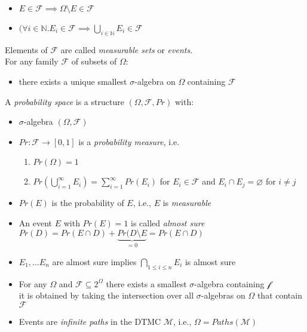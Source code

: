 \documentclass[a4paper, 10pt]{article}
\newcommand{\underbraceset}[2]{\underset{#1}{\underbrace{#2}}}
\begin{document}
\begin{mdframed}
\begin{itemize}
    \item $E\in\mathcal{F}\implies\Omega\setminus E\in\mathcal{F}$
    \item $(\forall i\in\mathds{N}.E_i\in\mathcal{F} \implies \bigcup_{i\in\mathds{N}} E_i\in\mathcal{F}$
\end{itemize}
Elements of $\mathcal{F}$ are called \emph{measurable sets} or \emph{events}. \\
For any family $\mathcal{F}$ of subsets of $\Omega$:
\begin{itemize}
    \item there exists a unique smallest $\sigma$-algebra on $\Omega$ containing $\mathcal{F}$
\end{itemize}
A \emph{probability space} is a structure $(\Omega,\mathcal{F},Pr)$ with:
\begin{itemize}
    \item $\sigma$-algebra $(\Omega,\mathcal{F})$
    \item $Pr:\mathcal{F}\to[0,1]$ is a \emph{probability measure}, i.e.
    \begin{enumerate}
        \item $Pr(\Omega)=1$
        \item $Pr(\bigcup^\infty_{i=1} E_i) = \sum^\infty_{i=1}Pr(E_i)$ for $E_i\in\mathcal{F}$ and $E_i\cap E_j=\varnothing$ for $i\not= j$
    \end{enumerate}
    \item $Pr(E)$ is the probability of $E$, i.e., $E$ is \emph{measurable}
\end{itemize}
\begin{itemize}
    \item An event $E$ with $Pr(E)=1$ is called \emph{almost sure} \\
    $Pr(D)=Pr(E\cap D)+\underbraceset{=0}{Pr(D\setminus E}=Pr(E\cap D)$
    \item $E_1,\dots E_n$ are almost sure implies $\bigcap_{1\leq i\leq n}E_i$ is almost sure
\item For any $\Omega$ and $\mathcal{F}\subseteq2^\Omega$ there exists a smallest $\sigma$-algebra containing $\mathcal{f}$
\\ it is obtained by taking the intersection over all $\sigma$-algebras on $\Omega$ that contain $\mathcal{F}$
\end{itemize}
\begin{itemize}
    \item Events are \emph{infinite paths} in the DTMC $\mathcal{M}$, i.e., $\Omega=Paths(\mathcal{M})$

\end{itemize}
\end{mdframed}
\end{document}
